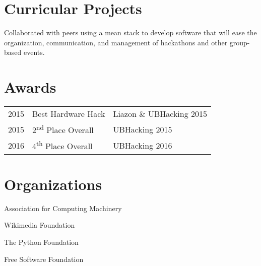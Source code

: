\documentclass[]{deedy-resume-openfont}
\begin{document}
\begin{minipage}[t]{0.66\textwidth}

\section{Curricular Projects}
\begin{tightemize}
\item Collaborated with peers using a mean stack to develop software that will ease the organization, communication, and management of hackathons and other group-based events.
\end{tightemize}
\sectionsep


\section{Awards} 
\begin{tabular}{rll}
2015     & Best Hardware Hack  & Liazon \& UBHacking 2015\\
2015     & 2\textsuperscript{nd} Place Overall  & UBHacking 2015\\
2016     & 4\textsuperscript{th} Place Overall  & UBHacking 2016\\
\end{tabular}
\sectionsep


\section{Organizations} 
\vspace{\topsep} %
\begin{tightemize}
\item Association for Computing Machinery\item Wikimedia Foundation\item The Python Foundation \item Free Software Foundation \end{tightemize}
\sectionsep

\end{minipage} 
\end{document}
